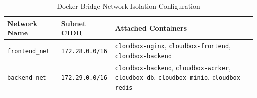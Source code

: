 \documentclass[11pt,a4paper]{report}
\begin{document}
\begin{table}[h!]
\centering
\small
\begin{tabularx}{\textwidth}{lp{3.5cm}X}
\toprule
\textbf{Network Name} & \textbf{Subnet CIDR} & \textbf{Attached Containers} \\
\midrule
\texttt{frontend\_net} & \texttt{172.28.0.0/16} & \texttt{cloudbox-nginx}, \texttt{cloudbox-frontend}, \texttt{cloudbox-backend} \\
\texttt{backend\_net} & \texttt{172.29.0.0/16} & \texttt{cloudbox-backend}, \texttt{cloudbox-worker}, \texttt{cloudbox-db}, \texttt{cloudbox-minio}, \texttt{cloudbox-redis} \\
\bottomrule
\end{tabularx}
\caption{Docker Bridge Network Isolation Configuration}
\end{table}
\end{document}
